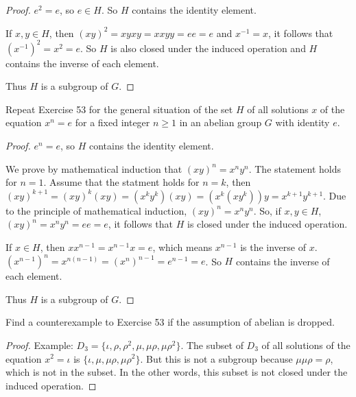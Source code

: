 \begin{proof}
    $e^{2} = e$, so $e\in H$. So $H$ contains the identity element.

    If $x, y\in H$, then ${(xy)}^{2} = xyxy = xxyy = ee = e$ and $x^{-1} = x$, it follows that ${(x^{-1})}^{2} = x^{2} = e$. So $H$ is also closed under the induced operation and $H$ contains the inverse of each element.

    Thus $H$ is a subgroup of $G$.
\end{proof}

\begin{exercise}
    Repeat Exercise 53 for the general situation of the set $H$ of all solutions $x$ of the equation $x^{n} = e$ for a fixed integer $n \geq 1$ in an abelian group $G$ with identity $e$.
\end{exercise}

\begin{proof}
    $e^{n} = e$, so $H$ contains the identity element.

    We prove by mathematical induction that ${(xy)}^{n} = x^{n}y^{n}$. The statement holds for $n = 1$. Assume that the statment holds for $n = k$, then ${(xy)}^{k+1} = {(xy)}^{k}(xy) = (x^{k}y^{k})(xy) = (x^{k}(xy^{k}))y = x^{k+1}y^{k+1}$. Due to the principle of mathematical induction, ${(xy)}^{n} = x^{n}y^{n}$. So, if $x, y\in H$, ${(xy)}^{n} = x^{n}y^{n} = ee = e$, it follows that $H$ is closed under the induced operation.

    If $x\in H$, then $xx^{n-1} = x^{n-1}x = e$, which means $x^{n-1}$ is the inverse of $x$. ${(x^{n-1})}^{n} = x^{n(n-1)} = {(x^{n})}^{n-1} = e^{n-1} = e$. So $H$ contains the inverse of each element.

    Thus $H$ is a subgroup of $G$.
\end{proof}

\begin{exercise}
    Find a counterexample to Exercise 53 if the assumption of abelian is dropped.
\end{exercise}

\begin{proof}
    Example: $D_{3} = \{ \iota, \rho, \rho^{2}, \mu, \mu\rho, \mu\rho^{2} \}$. The subset of $D_{3}$ of all solutions of the equation $x^{2} = \iota$ is $\{ \iota, \mu, \mu\rho, \mu\rho^{2} \}$. But this is not a subgroup because $\mu\mu\rho = \rho$, which is not in the subset. In the other words, this subset is not closed under the induced operation.
\end{proof}


